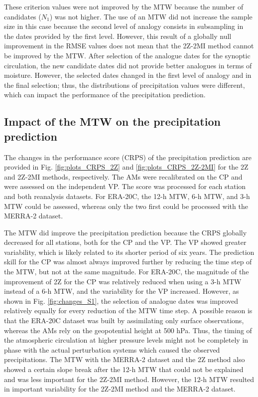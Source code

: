 \documentclass[hess, manuscript]{copernicus}
\begin{document}
	These criterion values were not improved by the MTW because the number of candidates ($N_{1}$) was not higher. The use of an MTW did not increase the sample size in this case because the second level of analogy consists in subsampling in the dates provided by the first level. However, this result of a globally null improvement in the RMSE values does not mean that the 2Z-2MI method cannot be improved by the MTW. After selection of the analogue dates for the synoptic circulation, the new candidate dates did not provide better analogues in terms of moisture. However, the selected dates changed in the first level of analogy and in the final selection; thus, the distributions of precipitation values were different, which can impact the performance of the precipitation prediction.
	
	
	\subsection{Impact of the MTW on the precipitation prediction}
	\label{sec:influence_scores}
	
	The changes in the performance score (CRPS) of the precipitation prediction are provided in Fig. \ref{fig:plots_CRPS_2Z} and \ref{fig:plots_CRPS_2Z-2MI} for the 2Z and 2Z-2MI methods, respectively. The AMs were recalibrated on the CP and were assessed on the independent VP. The score was processed for each station and both reanalysis datasets. For ERA-20C, the 12-h MTW, 6-h MTW, and 3-h MTW could be assessed, whereas only the two first could be processed with the MERRA-2 dataset.
	
	The MTW did improve the precipitation prediction because the CRPS globally decreased for all stations, both for the CP and the VP. The VP showed greater variability, which is likely related to its shorter period of six years. The prediction skill for the CP was almost always improved further by reducing the time step of the MTW, but not at the same magnitude. For ERA-20C, the magnitude of the improvement of 2Z for the CP was relatively reduced when using a 3-h MTW instead of a 6-h MTW, and the variability for the VP increased. However, as shown in Fig. \ref{fig:changes_S1}, the selection of analogue dates was improved relatively equally for every reduction of the MTW time step. A possible reason is that the ERA-20C dataset was built by assimilating only surface observations, whereas the AMs rely on the geopotential height at 500 hPa. Thus, the timing of the atmospheric circulation at higher pressure levels might not be completely in phase with the actual perturbation systems which caused the observed precipitations. The MTW with the MERRA-2 dataset and the 2Z method also showed a certain slope break after the 12-h MTW that could not be explained and was less important for the 2Z-2MI method. However, the 12-h MTW resulted in important variability for the 2Z-2MI method and the MERRA-2 dataset.
	
\end{document}
